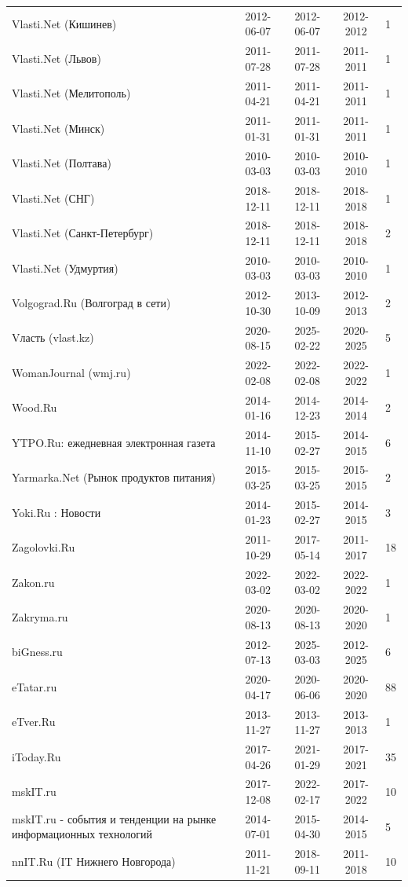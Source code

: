 \begin{longtable}{p{6cm}cccp{2cm}}
Vlasti.Net (Кишинев) & 2012-06-07 & 2012-06-07 & 2012-2012 & 1\\
Vlasti.Net (Львов) & 2011-07-28 & 2011-07-28 & 2011-2011 & 1\\
Vlasti.Net (Мелитополь) & 2011-04-21 & 2011-04-21 & 2011-2011 & 1\\
Vlasti.Net (Минск) & 2011-01-31 & 2011-01-31 & 2011-2011 & 1\\
Vlasti.Net (Полтава) & 2010-03-03 & 2010-03-03 & 2010-2010 & 1\\
Vlasti.Net (СНГ) & 2018-12-11 & 2018-12-11 & 2018-2018 & 1\\
Vlasti.Net (Санкт-Петербург) & 2018-12-11 & 2018-12-11 & 2018-2018 & 2\\
Vlasti.Net (Удмуртия) & 2010-03-03 & 2010-03-03 & 2010-2010 & 1\\
Volgograd.Ru (Волгоград в сети) & 2012-10-30 & 2013-10-09 & 2012-2013 & 2\\
Vласть (vlast.kz) & 2020-08-15 & 2025-02-22 & 2020-2025 & 5\\
WomanJournal (wmj.ru) & 2022-02-08 & 2022-02-08 & 2022-2022 & 1\\
Wood.Ru & 2014-01-16 & 2014-12-23 & 2014-2014 & 2\\
YTPO.Ru: ежедневная электронная газета & 2014-11-10 & 2015-02-27 & 2014-2015 & 6\\
Yarmarka.Net (Рынок продуктов питания) & 2015-03-25 & 2015-03-25 & 2015-2015 & 2\\
Yoki.Ru : Новости & 2014-01-23 & 2015-02-27 & 2014-2015 & 3\\
Zagolovki.Ru & 2011-10-29 & 2017-05-14 & 2011-2017 & 18\\
Zakon.ru & 2022-03-02 & 2022-03-02 & 2022-2022 & 1\\
Zakryma.ru & 2020-08-13 & 2020-08-13 & 2020-2020 & 1\\
biGness.ru & 2012-07-13 & 2025-03-03 & 2012-2025 & 6\\
eTatar.ru & 2020-04-17 & 2020-06-06 & 2020-2020 & 88\\
eTver.Ru & 2013-11-27 & 2013-11-27 & 2013-2013 & 1\\
iToday.Ru & 2017-04-26 & 2021-01-29 & 2017-2021 & 35\\
mskIT.ru & 2017-12-08 & 2022-02-17 & 2017-2022 & 10\\
mskIT.ru - события и тенденции на рынке информационных технологий & 2014-07-01 & 2015-04-30 & 2014-2015 & 5\\
nnIT.Ru (IT Нижнего Новгорода) & 2011-11-21 & 2018-09-11 & 2011-2018 & 10\\

\end{longtable}

